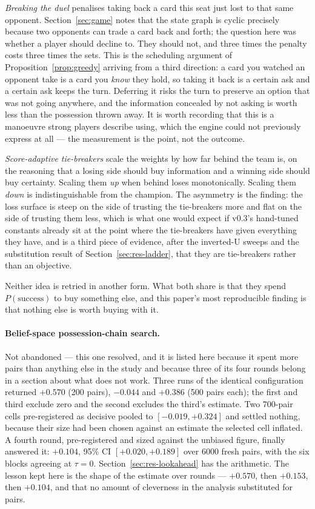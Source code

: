 \documentclass[11pt,letterpaper]{article}
\begin{document}
\emph{Breaking the duel} penalises taking back a card this seat just lost to that
same opponent. Section~\ref{sec:game} notes that the state graph is cyclic
precisely because two opponents can trade a card back and forth; the question
here was whether a player should decline to. They should not, and three times the
penalty costs three times the sets. This is the scheduling argument of
Proposition~\ref{prop:greedy} arriving from a third direction: a card you watched
an opponent take is a card you \emph{know} they hold, so taking it back is a
certain ask and a certain ask keeps the turn. Deferring it risks the turn to
preserve an option that was not going anywhere, and the information concealed by
not asking is worth less than the possession thrown away. It is worth recording
that this is a manoeuvre strong players describe using, which the engine could
not previously express at all --- the measurement is the point, not the outcome.

\emph{Score-adaptive tie-breakers} scale the weights by how far behind the team
is, on the reasoning that a losing side should buy information and a winning side
should buy certainty. Scaling them \emph{up} when behind loses monotonically.
Scaling them \emph{down} is indistinguishable from the champion. The asymmetry is
the finding: the loss surface is steep on the side of trusting the tie-breakers
more and flat on the side of trusting them less, which is what one would expect
if v0.3's hand-tuned constants already sit at the point where the tie-breakers
have given everything they have, and is a third piece of evidence, after the
inverted-U sweeps and the substitution result of Section~\ref{sec:res-ladder},
that they are tie-breakers rather than an objective.

Neither idea is retried in another form. What both share is that they spend
$P(\text{success})$ to buy something else, and this paper's most reproducible
finding is that nothing else is worth buying with it.

\paragraph{Belief-space possession-chain search.} Not abandoned --- this one
resolved, and it is listed here because it spent more pairs than anything else
in the study and because three of its four rounds belong in a section about
what does not work. Three runs of the identical configuration returned $+0.570$
(200 pairs), $-0.044$ and $+0.386$ (500 pairs each); the first and third exclude
zero and the second excludes the third's estimate. Two 700-pair cells
pre-registered as decisive pooled to $[-0.019, +0.324]$ and settled nothing,
because their size had been chosen against an estimate the selected cell
inflated. A fourth round, pre-registered and sized against the unbiased figure,
finally answered it: $+0.104$, 95\% CI $[+0.020, +0.189]$ over 6000 fresh pairs,
with the six blocks agreeing at $\tau = 0$. Section~\ref{sec:res-lookahead} has
the arithmetic. The lesson kept here is the shape of the estimate over rounds
--- $+0.570$, then $+0.153$, then $+0.104$, and that no amount of cleverness
in the analysis substituted for pairs.
\end{document}
